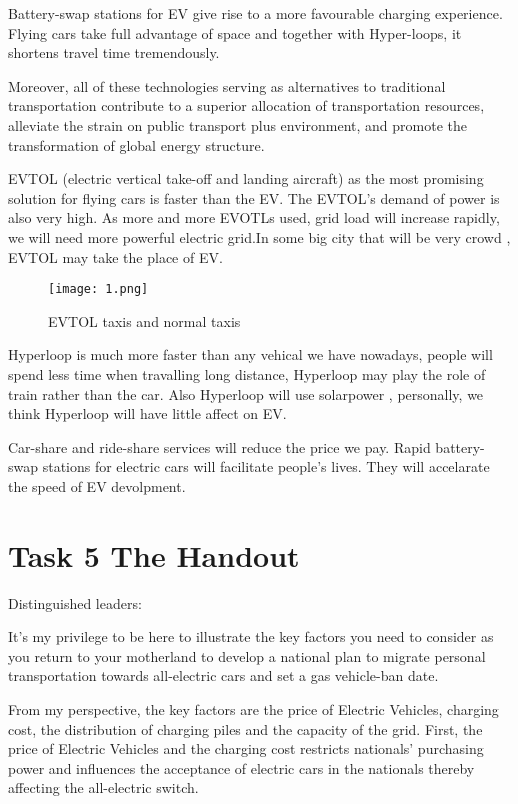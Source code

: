 \documentclass{mcmthesis}
\begin{document}
Battery-swap stations for EV give rise to a more favourable charging experience. Flying cars take full advantage of space and together with Hyper-loops, it shortens travel time tremendously. 

Moreover, all of these technologies serving as alternatives to traditional transportation contribute to a superior allocation of transportation resources, alleviate the strain on public transport plus environment, and promote the transformation of global energy structure.

EVTOL (electric vertical take-off and landing aircraft) as the most promising solution for flying cars is faster than the EV. The EVTOL's demand of power is also very high. As more and more EVOTLs used, grid load will increase rapidly, we will need more powerful electric grid.In some big city that will be very crowd , EVTOL may take the place of EV.

\begin{figure}[htbp]
\small
\centering
\texttt{[image: 1.png]}
\caption{EVTOL taxis and normal taxis} 
\end{figure}

Hyperloop is much more faster than any vehical we have nowadays, people will spend less time when travalling long distance, Hyperloop may play the role of train rather than the car. Also Hyperloop will use solarpower , personally, we think Hyperloop will have little affect on EV.

Car-share and ride-share services will reduce the price we pay. Rapid battery-swap stations for electric cars will facilitate people's lives. They will accelarate the speed of EV devolpment.

\newpage

\section{Task 5  The Handout} 

Distinguished leaders:

    It's my privilege to be here to illustrate the key factors you need to consider as you return to your motherland to develop a national plan to migrate personal transportation towards all-electric cars and set a gas vehicle-ban date. 
    
    From my perspective, the key factors are the price of Electric Vehicles, charging cost, the distribution of charging piles and the capacity of the grid. First, the price of Electric Vehicles and the charging cost restricts nationals' purchasing power and influences the acceptance of electric cars in the nationals thereby affecting the all-electric switch. 	
    
\end{document}
